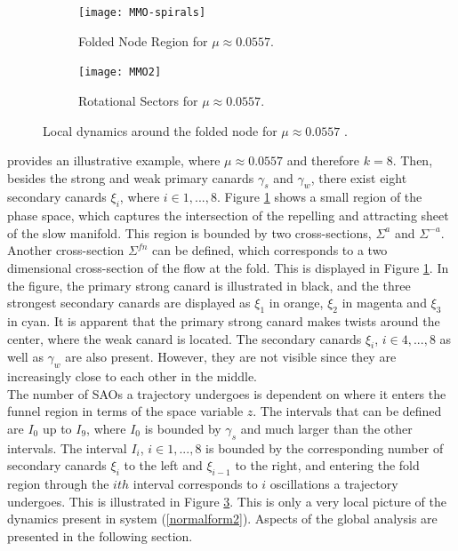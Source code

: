 %

\begin{figure}[h!]
	\centering
	\begin{subfigure}[t]{0.45\textwidth}
		\centering
			\texttt{[image: MMO-spirals]}
		\caption{Folded Node Region for $\mu \approx0.0557$.}
		\label{fig: MMo1pic}
	\end{subfigure}
	\hfill
	\begin{subfigure}[t]{0.45\textwidth}
			\texttt{[image: MMO2]}
		\caption{Rotational Sectors for $\mu \approx 0.0557$.}
		\label{fig: MMo2pic} 
	\end{subfigure}
\caption{Local dynamics around the folded node for $\mu \approx 0.0557$ \citep{MMO}.}
\end{figure}\newpage


\citet{MMO} provides an illustrative example, where $ \mu \approx 0.0557$ and therefore $k=8$. Then, besides the strong and weak primary canards $\gamma_s$ and $\gamma_w$, there exist eight secondary canards $\xi_i$, where $ i \in 1,...,8$.
Figure \ref{fig: MMo1pic} shows a small region of the phase space, which captures the intersection of the repelling and attracting sheet of the slow manifold. This region is bounded by two cross-sections, $\Sigma^a$ and $\Sigma^{-a}$.
Another cross-section $\Sigma^{fn}$ can be defined, which corresponds to a two dimensional cross-section of the flow at the fold. This is displayed in Figure \ref{fig: MMo1pic}. In the figure, the primary strong canard is illustrated in black, and the three strongest secondary canards are displayed as $\xi_1$ in orange, $\xi_2$ in magenta and $\xi_3$ in cyan. It is apparent that the primary strong canard makes  twists around the center, where the weak canard is located. The secondary canards $\xi_i$, $ i \in 4,...,8$ as well as $\gamma_w$ are also present. However, they are not visible since they are increasingly close to each other in the middle.\\

The number of SAOs a trajectory undergoes is dependent on where it enters the funnel region in terms of the space variable $z$. The intervals that can be defined are $I_0$ up to $I_9$, where $I_0$ is bounded by $\gamma_s$ and much larger than the other intervals. The interval $I_i$, $i \in 1, ..., 8$ is bounded by the corresponding number of secondary canards $\xi_i$ to the left and $\xi_{i-1}$ to the right, and entering the fold region through the $ith$ interval corresponds to $i$ oscillations a trajectory undergoes. This is illustrated in Figure \ref{fig: MMo2pic}. This is only a very local picture of the dynamics present in system (\ref{normalform2}). Aspects of the global analysis are presented in the following section.
